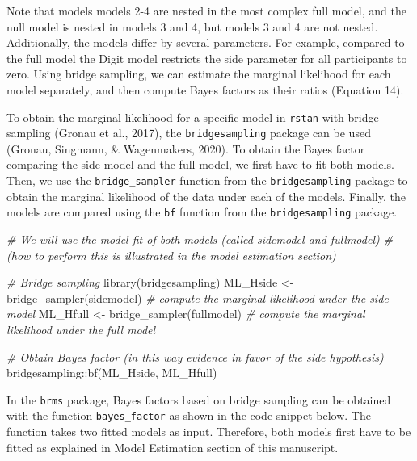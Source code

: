 \documentclass[
  english,
  doc,floatsintext]{apa6}
\newenvironment{Shaded}{\begin{snugshade}}{\end{snugshade}}
\newcommand{\CommentTok}[1]{\textcolor[rgb]{0.56,0.35,0.01}{\textit{#1}}}
\newcommand{\FunctionTok}[1]{\textcolor[rgb]{0.00,0.00,0.00}{#1}}
\newcommand{\NormalTok}[1]{#1}
\newcommand{\OtherTok}[1]{\textcolor[rgb]{0.56,0.35,0.01}{#1}}
\newcommand{\SpecialCharTok}[1]{\textcolor[rgb]{0.00,0.00,0.00}{#1}}
\begin{document}
Note that models models 2-4 are nested in the most complex full model, and the null model is nested in models 3 and 4, but models 3 and 4 are not nested. Additionally, the models differ by several parameters. For example, compared to the full model the Digit model restricts the side parameter for all participants to zero. Using bridge sampling, we can estimate the marginal likelihood for each model separately, and then compute Bayes factors as their ratios (Equation 14).

To obtain the marginal likelihood for a specific model in \texttt{rstan} with bridge sampling (Gronau et al., 2017), the \texttt{bridgesampling} package can be used (Gronau, Singmann, \& Wagenmakers, 2020). To obtain the Bayes factor comparing the side model and the full model, we first have to fit both models. Then, we use the \texttt{bridge\_sampler} function from the \texttt{bridgesampling} package to obtain the marginal likelihood of the data under each of the models. Finally, the models are compared using the \texttt{bf} function from the \texttt{bridgesampling} package.
~

\scriptsize

\begin{Shaded}
\begin{Highlighting}[]
\CommentTok{\# We will use the model fit of both models (called sidemodel and fullmodel)}
\CommentTok{\# (how to perform this is illustrated in the model estimation section)}

\CommentTok{\# Bridge sampling }
\FunctionTok{library}\NormalTok{(bridgesampling)}
\NormalTok{ML\_Hside }\OtherTok{\textless{}{-}} \FunctionTok{bridge\_sampler}\NormalTok{(sidemodel)  }\CommentTok{\# compute the marginal likelihood under the side model }
\NormalTok{ML\_Hfull }\OtherTok{\textless{}{-}} \FunctionTok{bridge\_sampler}\NormalTok{(fullmodel)  }\CommentTok{\# compute the marginal likelihood under the full model }

\CommentTok{\# Obtain Bayes factor (in this way evidence in favor of the side hypothesis)}
\NormalTok{bridgesampling}\SpecialCharTok{::}\FunctionTok{bf}\NormalTok{(ML\_Hside, ML\_Hfull)}
\end{Highlighting}
\end{Shaded}

\normalsize

In the \texttt{brms} package, Bayes factors based on bridge sampling can be obtained with the function \texttt{bayes\_factor} as shown in the code snippet below. The function takes two fitted models as input. Therefore, both models first have to be fitted as explained in Model Estimation section of this manuscript.
\end{document}
